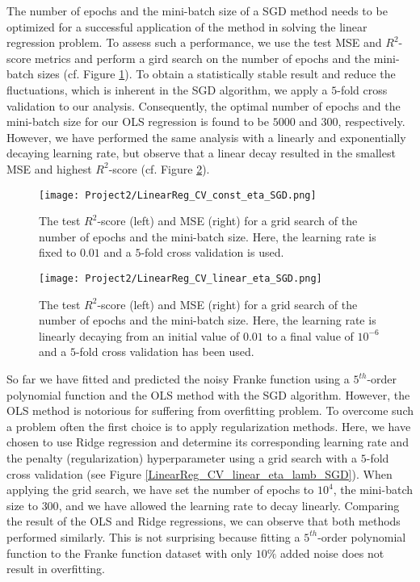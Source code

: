 \documentclass[a4paper]{article}
\begin{document}
The number of epochs and the mini-batch size of a SGD method needs to be optimized for a successful application of the method in solving the linear regression problem. To assess such a performance, we use the test MSE and $R^2$-score metrics and perform a gird search on the number of epochs and the mini-batch sizes (cf. Figure \ref{LinearReg_CV_const_eta_SGD}). To obtain a statistically stable result and reduce the fluctuations, which is inherent in the SGD algorithm, we apply a $5$-fold cross validation to our analysis. Consequently, the optimal number of epochs and the mini-batch size for our OLS regression is found to be $5000$ and $300$, respectively. However, we have performed the same analysis with a linearly and exponentially decaying learning rate, but observe that a linear decay resulted in the smallest MSE and highest $R^2$-score (cf. Figure \ref{LinearReg_CV_linear_eta_SGD}). 

\begin{figure}[H]
  \centering
  \texttt{[image: Project2/LinearReg\_CV\_const\_eta\_SGD.png]}
  \caption{The test $R^2$-score (left) and MSE (right) for a grid search of the number of epochs and the mini-batch size. Here, the learning rate is fixed to $0.01$ and a $5$-fold cross validation is used.}
    \label{LinearReg_CV_const_eta_SGD}
\end{figure}

\begin{figure}[H]
  \centering
  \texttt{[image: Project2/LinearReg\_CV\_linear\_eta\_SGD.png]}
  \caption{The test $R^2$-score (left) and MSE (right) for a grid search of the number of epochs and the mini-batch size. Here, the learning rate is linearly decaying from an initial value of $0.01$ to a final value of $10^{-6}$ and a $5$-fold cross validation has been used.}
    \label{LinearReg_CV_linear_eta_SGD}
\end{figure}

So far we have fitted and predicted the noisy Franke function using a $5^{th}$-order polynomial function and the OLS method with the SGD algorithm. However, the OLS method is notorious for suffering from overfitting problem. To overcome such a problem often the first choice is to apply regularization methods. Here, we have chosen to use Ridge regression and determine its corresponding learning rate and the penalty (regularization) hyperparameter using a grid search with a $5$-fold cross validation (see Figure \ref{LinearReg_CV_linear_eta_lamb_SGD}). When applying the grid search, we have set the number of epochs to $10^4$, the mini-batch size to $300$, and we have allowed the learning rate to decay linearly. Comparing the result of the OLS and Ridge regressions, we can observe that both methods performed similarly. This is not surprising because fitting a $5^{th}$-order polynomial function to the Franke function dataset with only $10\%$ added noise does not result in overfitting.
\end{document}
